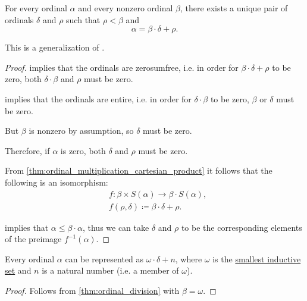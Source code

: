 \begin{corollary}\label{thm:ordinal_division}
  For every ordinal \( \alpha \) and every nonzero ordinal \( \beta \), there exists a unique pair of ordinals \( \delta \) and \( \rho \) such that \( \rho < \beta \) and
  \begin{equation*}
    \alpha = \beta \cdot \delta + \rho.
  \end{equation*}
\end{corollary}
\begin{comments}
  \item This is a generalization of .
\end{comments}
\begin{proof}
    implies that the ordinals are zerosumfree, i.e. in order for \( \beta \cdot \delta + \rho \) to be zero, both \( \delta \cdot \beta \) and \( \rho \) must be zero.

   implies that the ordinals are entire, i.e. in order for \( \delta \cdot \beta \) to be zero, \( \beta \) or \( \delta \) must be zero.

  But \( \beta \) is nonzero by assumption, so \( \delta \) must be zero.

  Therefore, if \( \alpha \) is zero, both \( \delta \) and \( \rho \) must be zero.

   From \cref{thm:ordinal_multiplication_cartesian_product} it follows that the following is an isomorphism:
  \begin{equation*}
    \begin{aligned}
      &f: \beta \times S(\alpha) \to \beta \cdot S(\alpha), \\
      &f(\rho, \delta) \coloneqq \beta \cdot \delta + \rho.
    \end{aligned}
  \end{equation*}

   implies that \( \alpha \leq \beta \cdot \alpha \), thus we can take \( \delta \) and \( \rho \) to be the corresponding elements of the preimage \( f^{-1}(\alpha) \).
\end{proof}

\begin{corollary}\label{thm:ordinal_division_omega}
  Every ordinal \( \alpha \) can be represented as \( \omega \cdot \delta + n \), where \( \omega \) is the \hyperref[def:smallest_inductive_set]{smallest inductive set} and \( n \) is a natural number (i.e. a member of \( \omega \)).
\end{corollary}
\begin{proof}
  Follows from \cref{thm:ordinal_division} with \( \beta = \omega \).
\end{proof}


